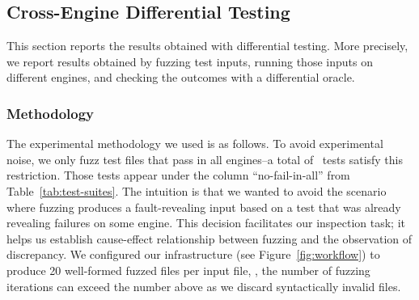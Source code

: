 \documentclass[10pt,conference,anonymous]{IEEEtran}
\begin{document}
\subsection{Cross-Engine Differential Testing}
\label{sec:cross-engine-diff-testing-results}

This section reports the results obtained with differential
testing. More precisely, we report results obtained by fuzzing test
inputs, running those inputs on different engines, and checking the
outcomes with a differential oracle.

\vspace{0.5ex}
\subsubsection{Methodology}
The experimental methodology we used is as follows. To avoid
experimental noise, we only fuzz test files that pass in all
engines--a total of \totalTestFilesPassInAll\ tests satisfy this
restriction.  Those tests appear under the column ``no-fail-in-all''
from Table~\ref{tab:test-suites}.  The intuition is that we wanted to
avoid the scenario where fuzzing produces a fault-revealing input
based on a test that was already revealing failures on some
engine. This decision facilitates our inspection task; it helps us
establish cause-effect relationship between fuzzing and the
observation of discrepancy.  We configured our infrastructure (see
Figure~\ref{fig:workflow}) to produce 20 well-formed fuzzed files per
input file, \ie{}, the number of fuzzing iterations can exceed the
number above as we discard syntactically invalid files.

\end{document}
